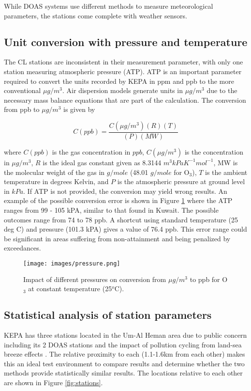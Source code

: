 While DOAS systems use different methods to measure meteorological parameters, the stations come complete with weather sensors. 

\subsection{Unit conversion with pressure and temperature}
The CL stations are inconsistent in their measurement parameter, with only one station measuring atmospheric pressure (ATP). ATP is an important parameter required to convert the units recorded by KEPA in ppm and ppb to the more conventional $\mu g/m^{3}$. Air dispersion models generate units in $\mu g/m^{3}$ due to the necessary mass balance equations that are part of the calculation. The conversion from ppb to  $\mu g/m^{3}$ is given by 

%
\begin{equation}
\label{eq:gasequation}
C(ppb) = \frac{C(\mu g/m^{3})(R) (T)}{(P) (MW)}
\end{equation}
%

\noindent
where $C(ppb)$ is the gas concentration in $ppb$, $C(\mu g/m^{3})$ is the concentration in $\mu g/m^{3}$, $R$ is the ideal gas constant given as 8.3144 $m^{3}kPa K^{-1}mol^{-1}$, MW is the molecular weight of the gas in $g/mole$ (48.01 $g/mole$ for O$_{3}$), $T$ is the ambient temperature in degrees Kelvin, and $P$ is the atmospheric pressure at ground level in $kPa$.  If ATP is not provided, the conversion may yield wrong results. An example of the possible conversion error is shown in Figure \ref{fig:pressure} where the ATP ranges from 99 - 105 kPA, similar to that found in Kuwait. The possible outcomes range from 74 to 78 ppb. A shortcut using standard temperature (25 deg C) and pressure (101.3 kPA) gives a value of 76.4 ppb. This error range could be significant in areas suffering from non-attainment and being penalized by exceedances. 

%
\begin{figure}[H]
\centering
\texttt{[image: images/pressure.png]} 
\caption[Impact of different pressures on air concentration conversion at constant temperature.]{Impact of different pressures on conversion from $\mu g/m^{3}$ to ppb for O$_{3}$ at constant temperature (25$^{o}$C).}
\label{fig:pressure}
\end{figure}
%

\subsection{Statistical analysis of station parameters}
KEPA has three stations located in the Um-Al Heman area due to public concern including its 2 DOAS stations \citep{Carlisle2010} and the impact of pollution cycling from land-sea breeze effects \cite{Freeman2017}.  The relative proximity to each (1.1-1.6km from each other) makes this an ideal test environment to compare results and determine whether the two methods provide statistically similar results. The locations relative to each other are shown in Figure \ref{fig:stations}.

